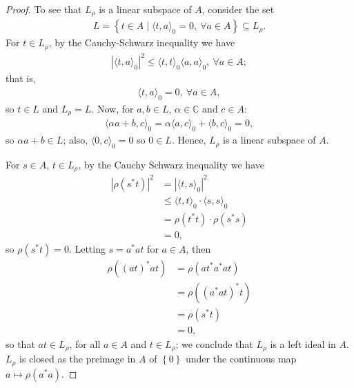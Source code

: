 \documentclass[11pt,a4paper]{report}
\theoremstyle{plain}
\theoremstyle{definition}
\newcommand{\1}{\mathbbm{1}}
\begin{document}
\begin{proof}
	To see that $L_\rho$ is a linear subspace of $A$, consider the set
	\begin{align*}
		L= \left\{t \in A  \mid \langle t,a \rangle _0 = 0,
				~\forall a \in A \right\} \subseteq L_\rho.
	\end{align*}
	For $t \in L_\rho$, by the Cauchy-Schwarz inequality we have 
	\begin{align*} 
		|\langle t,a \rangle_0|^2 \leq \langle t,t \rangle_0 \langle a,a\rangle_0,
				~ \forall a \in A;
	\end{align*}
	that is,
	\begin{align*}
		\langle t,a \rangle _0 = 0, ~ \forall a \in A,
	\end{align*}
	so $t\in L$ and $L_\rho =L$.
	Now, for $a,b \in L$, $\alpha \in \mathbb{C}$ and $c \in A$:
	\begin{align*}
		\langle \alpha a + b, c \rangle _0 = \alpha \langle a,c \rangle _0 + 
						\langle b,c\rangle _0 = 0,
	\end{align*}
	so $\alpha a +b \in L$; also, $\langle 0,c\rangle _0 = 0$ so $0 \in L$. 
	Hence, $L_\rho  $ is a linear subspace of $A$.
	
	For $s \in A$, $t\in L_\rho$, by the Cauchy Schwarz inequality we have 
	\begin{align*}
		|\rho (s^\ast t) |^2 	
		&= 		|\langle t,s\rangle_0 |^2 												\\
		&\leq 	\langle t,t\rangle_0 \cdot \langle s,s\rangle_0  						\\
		&= 		\rho (t^\ast t) \cdot \rho (s^\ast s)									\\
		&=		0,
	\end{align*}
	so $\rho (s^\ast t) = 0$. Letting $s = a^\ast a t$ for $a \in A$, then
	\begin{align*}
		\rho ((at)^\ast at) 
		&= 		\rho (at^\ast a^\ast at) 												\\
		&= 		\rho ((a^\ast at)^\ast t) 												\\
		&= 		\rho (s^\ast t) 														\\
		&=		0,
	\end{align*}
	so that $at \in L_\rho$, for all $a \in A$ and $t \in L_\rho$; we conclude that 
	$L_\rho$ is a left ideal in $A$. $L_\rho$ is closed as the preimage in $A$ of 
	$\left\{0\right\}$ under the continuous map $a \mapsto \rho (a^\ast a)$. 


\end{proof}
\end{document}
